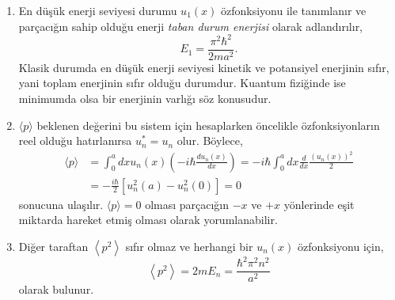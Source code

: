 \documentclass[a4paper,12pt, twoside]{article}
\begin{document}
\begin{enumerate}
	\item En düşük enerji seviyesi durumu $u_1(x)$ özfonksiyonu ile tanımlanır ve parçacığın sahip olduğu enerji \emph{taban durum enerjisi} olarak adlandırılır,
	\begin{equation}
	E _ { 1 } = \frac { \pi ^ { 2 } \hbar ^ { 2 } } { 2 m a ^ { 2 } }.
	\end{equation}
	Klasik durumda en düşük enerji seviyesi kinetik ve potansiyel enerjinin sıfır, yani toplam enerjinin sıfır olduğu durumdur. Kuantum fiziğinde ise minimumda olsa bir enerjinin varlığı söz konusudur.
	
	\item $\langle p \rangle$ beklenen değerini bu sistem için hesaplarken  öncelikle özfonksiyonların reel olduğu hatırlanırsa $u^\ast_{ n } = u _ { n }$ olur. Böylece,
	\begin{equation}
	\begin{aligned} 
	\langle p \rangle 
	& = \int _ { 0 } ^ { a } d x u _ { n } ( x ) \left( - i \hbar \frac { d u _ { n } ( x ) } { d x } \right) 
	= - i \hbar \int _ { 0 } ^ { a } d x \frac { d } { d x } \frac { \left( u _ {n} ( x ) \right) ^ { 2 } } { 2 } \\ 
	& = - \frac { i \hbar } { 2 } \left[ u _ { n } ^ { 2 } ( a ) - u _ { n } ^ { 2 } ( 0 ) \right] = 0 
	\end{aligned}
	\end{equation}
	sonucuna ulaşılır. $\langle p \rangle = 0$ olması parçacığın $-x$ ve $+x$ yönlerinde eşit miktarda hareket etmiş olması olarak yorumlanabilir.
	
	\item Diğer taraftan $\left\langle p ^ { 2 } \right\rangle$ sıfır olmaz ve herhangi bir $u_n(x)$ özfonksiyonu için,
	\begin{equation}
	\left\langle p ^ { 2 } \right\rangle = 2 m E _ { n } = \frac { \hbar ^ { 2 } \pi ^ { 2 } n ^ { 2 } } { a ^ { 2 } }
	\end{equation}
	olarak bulunur.
	

\end{enumerate}
\end{document}
